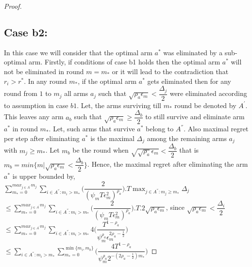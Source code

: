 \begin{proof}
\subsection{Case b2:} 
In this case we will consider that the optimal arm $a^{*}$ was eliminated by a sub-optimal arm. Firstly, if conditions of case b1 holds then the optimal arm $a^{*}$ will not be eliminated in round $m=m_{*}$ or it will lead to the contradiction that $r_{i}>r^{*}$. In any round $m_{*}$, if the optimal arm $a^{*}$ gets eliminated then for any round from $1$ to $m_{j}$ all arms $a_{j}$ such that $\sqrt{\rho_{a}\epsilon_{m}}<\dfrac{\Delta_{j}}{2}$ were eliminated according to assumption in case $b1$. Let, the arms surviving till $m_{*}$ round be denoted by $A^{'}$. This leaves any arm $a_{b}$ such that $\sqrt{\rho_{a}\epsilon_{m}}\geq\dfrac{\Delta_{b}}{2}$ to still survive and eliminate arm $a^{*}$ in round $m_{*}$. Let, such arms that survive $a^{*}$ belong to $A^{''}$. Also maximal regret per step after eliminating $a^{*}$ is the maximal $\Delta_{j}$ among the remaining arms $a_{j}$ with $m_{j}\geq m_{*}$.  Let $m_{b}$ be the round when $\sqrt{\sqrt{\rho_{a}}\epsilon_{m}}<\dfrac{\Delta_{b}}{2}$ that is $m_{b}=min\lbrace m|\sqrt{\rho_{a}\epsilon_{m}}<\dfrac{\Delta_{b}}{2}\rbrace$. Hence, the maximal regret after eliminating the arm $a^{*}$ is upper bounded by, 
\newline
$\sum_{m_{*}=0}^{max_{j\in A^{'}}m_{j}}\sum_{i\in A^{''}:m_{i}>m_{*}}\bigg(\dfrac{2}{(\psi_{m}T\epsilon_{m}^{2})^{\rho_{a}}} \bigg).T\max_{j\in A^{''}:m_{j}\geq m_{*}}{\Delta}_{j}$
\newline
\hspace*{0em}$\leq\sum_{m_{*}=0}^{max_{j\in A^{'}}m_{j}}\sum_{i\in A^{''}:m_{i}>m_{*}}\bigg(\dfrac{2}{(\psi_{m}T\epsilon_{m}^{2})^{\rho_{a}}} \bigg).T.2\sqrt{\rho_{a}\epsilon_{m}}$, since $\sqrt{\rho_{a}\epsilon_{m}}<\dfrac{\Delta_{i}}{2}$
\newline
\hspace*{0em}$\leq\sum_{m_{*}=0}^{max_{j\in A^{'}}m_{j}}\sum_{i\in A^{''}:m_{i}>m_{*}}4\bigg(\dfrac{T^{1-\rho_{a}}}{\psi_{m}^{\rho_{a}}\epsilon_{m}^{2\rho_{a}-\frac{1}{2}}} \bigg) $
\newline
\hspace*{0em}$\leq\sum_{i\in A^{''}:m_{i}>m_{*}}\sum_{m_{*}=0}^{\min{\lbrace m_{i},m_{b}\rbrace}}\bigg(\dfrac{4T^{1-\rho_{a}}}{\psi_{m}^{\rho_{a}}2^{-(2\rho_{a}-\frac{1}{2})m_{*}}} \bigg) $

\end{proof}
